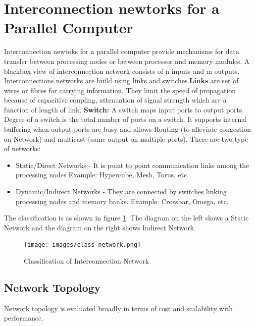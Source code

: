 \documentclass[12pt]{article}
\begin{document}
\section{Interconnection newtorks for a Parallel Computer}
Interconnection newtoks for a parallel computer provide mechanisms for data transfer between processing nodes or between
processor and memory modules. A blackbox view of interconnection network consists of n inputs and m outputs. Interconnections networks are build using links and switches.\textbf{Links} are set of wires 
or fibres for carrying information. They limit the speed of propagation because of capacitive coupling, attenuation of signal strength 
which are a function of length of link. \textbf{Switch: }A switch maps input ports to output ports. Degree of a switch is the total number of ports on a switch.
It supports internal buffering when output ports are busy and allows Routing (to alleviate congestion on Network) and 
multicast (same output on multiple ports). There are two type of networks:
\begin{itemize}
    \item Static/Direct Networks - It is point to point communication links among the processing nodes Example: Hypercube, Mesh, Torus, etc.
    \item Dynamic/Indirect Networks - They are connected by switches linking processing nodes and memory banks. Example: Crossbar, Omega, etc.
\end{itemize}
The classification is as shown in figure \ref{fig:class_network}. The diagram on the left shows a Static Network and the diagram on the right shows Indirect Network.
\begin{figure}[H]
    \centering
    \texttt{[image: images/class\_network.png]}
    \caption{Classification of Interconnection Network}
    \label{fig:class_network}
\end{figure}

\subsection{Network Topology}
Network topology is evaluated broadly in terms of cost and scalability with performance.
\end{document}
